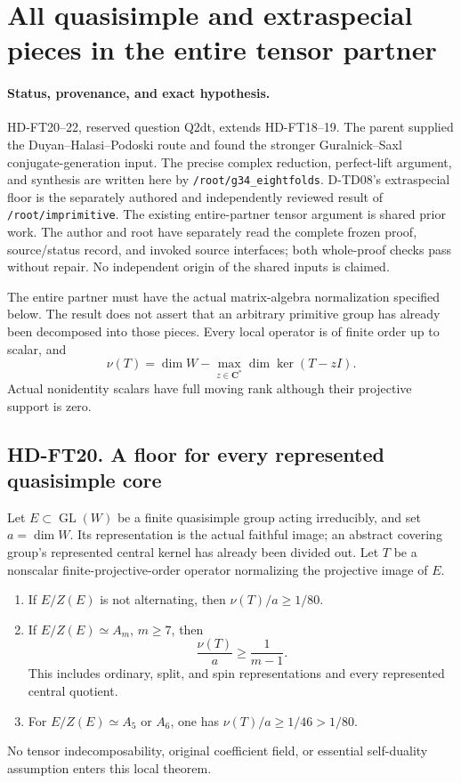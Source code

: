 \section{All quasisimple and extraspecial pieces in the entire tensor partner}
\label{sec:quasisimple-partner-support}

\paragraph{Status, provenance, and exact hypothesis.}
HD-FT20--22, reserved question Q2dt, extends HD-FT18--19.
The parent supplied the Duyan--Halasi--Podoski route and found the
stronger Guralnick--Saxl conjugate-generation input.  The precise
complex reduction, perfect-lift argument, and synthesis are written
here by \texttt{/root/g34\_eightfolds}.  D-TD08's extraspecial floor
is the separately authored and independently reviewed result of
\texttt{/root/imprimitive}.  The existing entire-partner tensor
argument is shared prior work.  The author and root have separately read the complete frozen proof, source/status record, and invoked source interfaces; both whole-proof checks pass without repair. No independent origin of the shared inputs is claimed.

The entire partner must have the actual matrix-algebra normalization
specified below.  The result does not assert that an arbitrary
primitive group has already been decomposed into those pieces.
Every local operator is of finite order up to scalar, and
\[
 \nu(T)=\dim W-\max_{z\in\mathbf C^*}\dim\ker(T-zI).
 \tag{FTQ.1}
\]
Actual nonidentity scalars have full moving rank although their
projective support is zero.

\subsection*{HD-FT20. A floor for every represented quasisimple core}

\begin{theorem}[HD-FT20]
Let \(E\subset\operatorname{GL}(W)\) be a finite quasisimple group
acting irreducibly, and set \(a=\dim W\).  Its representation is the
actual faithful image; an abstract covering group's represented
central kernel has already been divided out.  Let \(T\) be a
nonscalar finite-projective-order operator normalizing the projective
image of \(E\).
\begin{enumerate}
\item If \(E/Z(E)\) is not alternating, then \(\nu(T)/a\ge1/80\).
\item If \(E/Z(E)\simeq A_m\), \(m\ge7\), then
\[
                         \frac{\nu(T)}a\ge\frac1{m-1}.
 \tag{FTQ.2}
\]
This includes ordinary, split, and spin representations and every
represented central quotient.
\item For \(E/Z(E)\simeq A_5\) or \(A_6\), one has
\(\nu(T)/a\ge1/46>1/80\).
\end{enumerate}
No tensor indecomposability, original coefficient field, or
essential self-duality assumption enters this local theorem.
\end{theorem}

